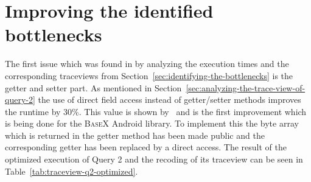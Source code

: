 \section{Improving the identified bottlenecks}
\label{sec:improving}
The first issue which was found in by analyzing the execution times and the corresponding traceviews from Section~\ref{sec:identifying-the-bottlenecks} is the getter and setter part.
As mentioned in Section~\ref{sec:analyzing-the-trace-view-of-query-2} the use of direct field access instead of getter/setter methods improves the runtime by 30\%.
This value is shown by~\cite{toninianalysis} and is the first improvement which is being done for the \textsc{BaseX} Android library.
To implement this the byte array which is returned in the getter method has been made public and the corresponding getter has been replaced by a direct access.
The result of the optimized execution of Query 2 and the recoding of its traceview can be seen in Table~\ref{tab:traceview-q2-optimized}.

